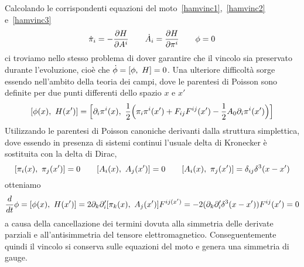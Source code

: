     Calcolando le corrispondenti equazioni del moto~\eqref{hamvinc1},~\eqref{hamvinc2} e~\eqref{hamvinc3} 
\begin{equation*}
    \dot \pi_i = - \frac{\partial H}{\partial A^i} \qquad \dot A_i = \frac{\partial H}{\partial\pi^i} \qquad \phi = 0
\end{equation*}
    ci troviamo nello stesso problema di dover garantire che il vincolo sia preservato durante l'evoluzione, cioè che $\dot \phi = [\phi, ~H] = 0$. Una ulteriore difficoltà sorge essendo nell'ambito della teoria dei campi, dove le parentesi di Poisson sono definite per due punti differenti dello spazio $x$ e $x'$
\begin{equation*}
    [\phi(x), ~H(x')] = \Big[\partial_i \pi^i (x), ~ \frac{1}{2} \Big( \pi_i \pi^i (x') + F_{ij} F^{ij}(x') - \frac{1}{2} A_0 \partial_i \pi^i (x') \Big) \Big]
\end{equation*}
    Utilizzando le parentesi di Poisson canoniche derivanti dalla struttura simplettica, dove essendo in presenza di sistemi continui l'usuale delta di Kronecker è sostituita con la delta di Dirac,
\begin{equation*}
    [\pi_i(x), ~\pi_j(x')] = 0 \qquad [A_i(x), ~A_j(x')] = 0 \qquad [A_i(x), ~\pi_j(x')] = \delta_{ij} \delta^3(x - x')
\end{equation*}
    otteniamo 
\begin{equation*}
    \frac{d}{dt} \phi = [\phi(x), ~H(x')] = 2 \partial_k \partial'_i [\pi_k(x), ~A_j(x')] F^{ij(x')} = -2(\partial_k \partial'_i \delta^3(x - x')) F^{ij} (x') = 0
\end{equation*}
    a causa della cancellazione dei termini dovuta alla simmetria delle derivate parziali e all'antisimmetria del tensore elettromagnetico. Conseguentemente quindi il vincolo si conserva sulle equazioni del moto e genera una simmetria di gauge.
    
